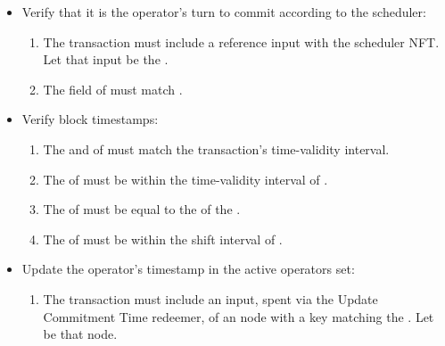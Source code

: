 \documentclass[../midgard.tex]{subfiles}
\begin{document}
\begin{description}
\begin{itemize}
            \item Verify that it is the operator's turn to commit according to the scheduler:
            \begin{enumerate}[resume]
                \item The transaction must include a reference input with the scheduler NFT. Let that input be the .
                \item The  field of  must match .
            \end{enumerate}

            \item Verify block timestamps:
            \begin{enumerate}[resume]
                \item The  and  of  must match the transaction's time-validity interval.
                \item The  of  must be within the time-validity interval of .
                \item The  of  must be equal to the  of the .
                \item The  of  must be within the shift interval of .
            \end{enumerate}
            
            \item Update the operator's timestamp in the active operators set:
            \begin{enumerate}[resume]
                \item The transaction must include an input, spent via the Update Commitment Time redeemer, of an  node with a key matching the . Let  be that node.
            \end{enumerate}
        \end{itemize}


\end{description}
\end{document}
